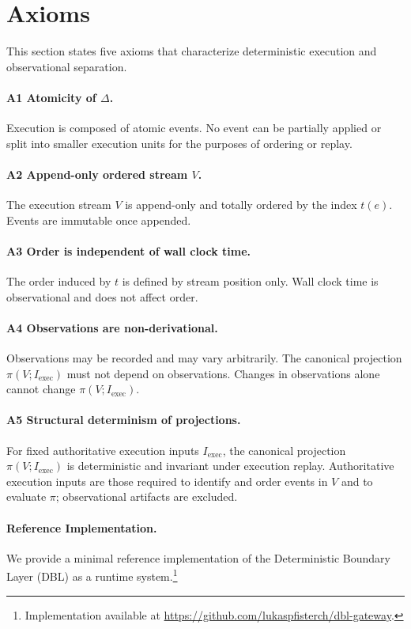 \section{Axioms}

This section states five axioms that characterize deterministic execution and observational separation.

\paragraph{A1 Atomicity of $\Delta$.}
Execution is composed of atomic events. No event can be partially applied or split into smaller execution units for the purposes of ordering or replay.

\paragraph{A2 Append-only ordered stream $V$.}
The execution stream $V$ is append-only and totally ordered by the index $t(e)$. Events are immutable once appended.

\paragraph{A3 Order is independent of wall clock time.}
The order induced by $t$ is defined by stream position only. Wall clock time is observational and does not affect order.

\paragraph{A4 Observations are non-derivational.}
Observations may be recorded and may vary arbitrarily. The canonical projection $\pi(V; I_{\text{exec}})$ must not depend on observations. Changes in observations alone cannot change $\pi(V; I_{\text{exec}})$.

\paragraph{A5 Structural determinism of projections.}
For fixed authoritative execution inputs $I_{\text{exec}}$, the canonical projection $\pi(V; I_{\text{exec}})$ is deterministic and invariant under execution replay. Authoritative execution inputs are those required to identify and order events in $V$ and to evaluate $\pi$; observational artifacts are excluded.

\paragraph{Reference Implementation.}
We provide a minimal reference implementation of the Deterministic Boundary
Layer (DBL) as a runtime system.\footnote{Implementation available at
\url{https://github.com/lukaspfisterch/dbl-gateway}.}

